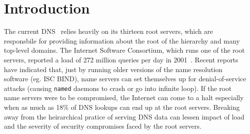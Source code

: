 \section{Introduction}

The current DNS~\cite{dns, dns-concept:rfc} relies heavily on its
thirteen root servers, which are responsbile for providing
information about the root of the hierarchy and many top-level domains.
The Internet Software Consortium, which runs one of the root servers,
reported a load of 272 million queries per day in 2001~\cite{isc-root}.
Recent reports~\cite{cert} have indicated that, just by running 
older versions of the name resolution software (eg. ISC BIND), 
name servers can set themselves up for denial-of-service attacks 
(causing {\tt named} daemons to crash or go into infinite loop).
If the root name servers were to be compromised, the Internet can 
come to a halt especially when as much as 18\% of DNS lookups 
can end up at the root servers. Breaking away from the heirarchical 
pratice of serving DNS data can lessen impact of load and the severity 
of security compromises faced by the root servers.

